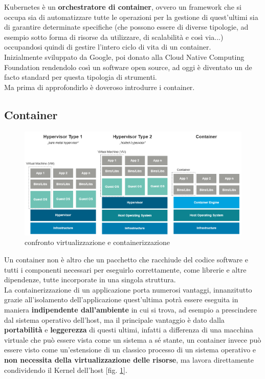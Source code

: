 Kubernetes è un \textbf{orchestratore di container}, ovvero un framework che si occupa sia di automatizzare tutte le operazioni per la gestione di quest'ultimi sia di garantire determinate specifiche (che possono essere di diverse tipologie, ad esempio sotto forma di risorse da utilizzare, di scalabilità e così via...) occupandosi quindi di gestire l'intero ciclo di vita di un container.
\\
Inizialmente sviluppato da Google, poi donato alla Cloud Native Computing Foundation \cite{CNCF} rendendolo così un software open source, ad oggi è diventato un de facto standard per questa tipologia di strumenti.
\\
Ma prima di approfondirlo è doveroso introdurre i container.

\subsection{Container}
\begin{figure}[ht]
    \centering
    \includegraphics[width=0.95\linewidth]{UNINA_BSc_Final_Report//img//explanation/VM vs Container.png}
    \caption{confronto virtualizzazione e containerizzazione \cite{Vm-vs-Container}}
    \label{fig:Container}
\end{figure}
Un container non è altro che un pacchetto che racchiude del codice software e tutti i componenti necessari per eseguirlo correttamente, come librerie e altre dipendenze, tutte incorporate in una singola struttura. \\
La containerizzazione di un applicazione porta numerosi vantaggi, innanzitutto grazie all'isolamento dell'applicazione quest'ultima potrà essere eseguita in maniera \textbf{indipendente dall'ambiente} in cui si trova, ad esempio a prescindere dal sistema operativo dell'host, ma il principale vantaggio è dato dalla \textbf{portabilità} e \textbf{leggerezza} di questi ultimi, infatti a differenza di una macchina virtuale che può essere vista come un sistema a sé stante, un container invece può essere visto come un'estensione di un classico processo di un sistema operativo e \textbf{non necessita della virtualizzazione delle risorse}, ma lavora direttamente condividendo il Kernel dell'host [fig. \ref{fig:Container}]. \\
